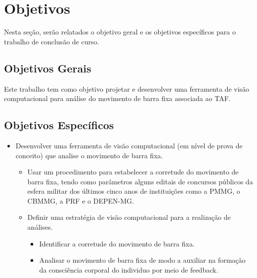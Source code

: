 \section{Objetivos}
Nesta seção, serão relatados o objetivo geral e os objetivos específicos para o trabalho de conclusão de curso.

\subsection{Objetivos Gerais}	
Este trabalho tem como objetivo projetar e desenvolver uma ferramenta de visão computacional para análise do movimento de barra fixa associada ao \ac{TAF}.

\subsection{Objetivos Específicos}	
\begin{itemize}

    \item Desenvolver uma ferramenta de visão computacional (em nível de prova de conceito) que analise o movimento de barra fixa.
    \begin{itemize}
        \item Usar um procedimento para estabelecer a corretude do movimento de barra fixa, tendo como parâmetros alguns editais de concursos públicos da esfera militar dos últimos cinco anos de instituições como a \ac{PMMG}, o \ac{CBMMG}, a \ac{PRF} e o \ac{DEPEN-MG}.
        \item Definir uma estratégia de visão computacional para a realização de análises.
        \begin{itemize}
            \item Identificar a corretude do movimento de barra fixa.
            \item Analisar o movimento de barra fixa de modo a auxiliar na formação da consciência corporal do individuo por meio de feedback.
        \end{itemize}
    \end{itemize}    
\end{itemize}


 
 